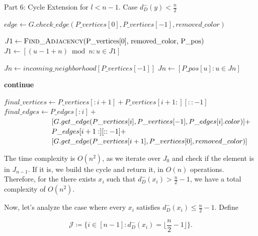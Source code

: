 \begin{algorithm}[H]
    \caption{Part 6: Cycle Extension for \( l < n - 1 \). Case \( d^-_D(y) < \frac{n}{2} \)}
    \begin{algorithmic}[1]
            \State $edge \gets G.check\_edge(P\_vertices[0], P\_vertices[-1], removed\_color)$
                \State \Return {}
            \EndIf

            \State $J1 \gets \Call{Find\_Adjacency}{$P\_vertices[0], removed\_color, P\_pos$}$
            \State $J1 \gets [(u - 1 + n) \bmod n : u \in J1]$

            \State $Jn \gets incoming\_neighborhood[P\_vertices[-1]]$
            \State $Jn \gets [P\_pos[u] : u \in Jn]$

                        \State \textbf{continue}
                    \EndIf

                    \State $final\_vertices \gets P\_vertices[:i+1] + P\_vertices[i+1:][::-1]$
                    \State $final\_edges \gets P\_edges[:i] +$
                    \State $\hspace{6.7em} [G.get\_edge(P\_vertices[i], P\_vertices[-1], P\_edges[i].color)] +$
                    \State $\hspace{6.7em} P\_edges[i+1:][::-1] +$
                    \State $\hspace{6.7em} [G.get\_edge(P\_vertices[i+1], P\_vertices[0], removed\_color)]$

                    \State \Return {}
                \EndIf
            \EndFor
        \EndFunction
    \end{algorithmic}
\end{algorithm}

The time complexity is $O(n^2)$, as we iterate over $J_0$ and check 
if the element is in $J_{n-1}$. If it is, we build the cycle and return it, in $O(n)$ operations.
Therefore, for the there exists $x_i$ such that $d^-_D(x_i) > \frac{n}{2} - 1$, we have a total 
complexity of $O(n^2)$.

Now, let's analyze the case where every $x_i$ satisfies $d^-_D(x_i) \leq \frac{n}{2} - 1$.
Define

\begin{equation}
    \mathcal{J} \coloneqq \{i \in [n-1]: d^-_D(x_i) = \lfloor \frac{n}{2} - 1 \rfloor\}.
    \label{eq:J_definition}
\end{equation}

